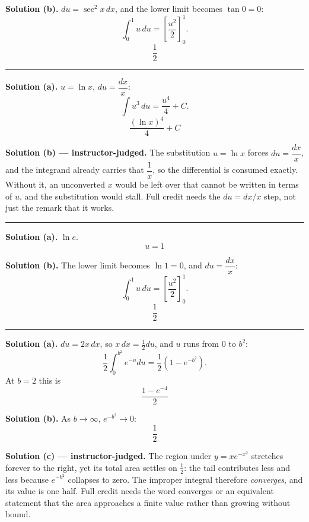 \documentclass[12pt]{article}
\begin{document}
\textbf{Solution (b).} $du = \sec^2 x\,dx$, and the lower limit becomes
$\tan 0 = 0$:
\[ \int_0^{1} u\,du = \left[\frac{u^2}{2}\right]_0^{1}. \]
\[ \boxed{\frac{1}{2}} \]

\vspace{0.15cm}\noindent\rule{\linewidth}{0.2pt}


\textbf{Solution (a).} $u = \ln x$, $du = \dfrac{dx}{x}$:
\[ \int u^3\,du = \frac{u^4}{4} + C. \]
\[ \boxed{\frac{\left(\ln x\right)^4}{4} + C} \]

\textbf{Solution (b) --- instructor-judged.} The substitution $u = \ln x$ forces
$du = \dfrac{dx}{x}$, and the integrand already carries that $\dfrac{1}{x}$, so
the differential is consumed exactly. Without it, an unconverted $x$ would be
left over that cannot be written in terms of $u$, and the substitution would
stall. Full credit needs the $du = dx/x$ step, not just the remark that it works.

\vspace{0.15cm}\noindent\rule{\linewidth}{0.2pt}


\textbf{Solution (a).} $\ln e$.
\[ \boxed{u = 1} \]

\textbf{Solution (b).} The lower limit becomes $\ln 1 = 0$, and
$du = \dfrac{dx}{x}$:
\[ \int_0^{1} u\,du = \left[\frac{u^2}{2}\right]_0^{1}. \]
\[ \boxed{\frac{1}{2}} \]

\vspace{0.15cm}\noindent\rule{\linewidth}{0.2pt}


\textbf{Solution (a).} $du = 2x\,dx$, so $x\,dx = \tfrac{1}{2}du$, and $u$ runs
from $0$ to $b^2$:
\[ \frac{1}{2}\int_0^{b^2}e^{-u}du = \frac{1}{2}\left(1 - e^{-b^2}\right). \]
At $b = 2$ this is
\[ \boxed{\frac{1 - e^{-4}}{2}} \]

\textbf{Solution (b).} As $b \rightarrow \infty$, $e^{-b^2} \rightarrow 0$:
\[ \boxed{\frac{1}{2}} \]

\textbf{Solution (c) --- instructor-judged.} The region under
$y = xe^{-x^2}$ stretches forever to the right, yet its total area settles on
$\tfrac{1}{2}$: the tail contributes less and less because $e^{-b^2}$ collapses
to zero. The improper integral therefore \emph{converges}, and its value is one
half. Full credit needs the word converges or an equivalent statement that the
area approaches a finite value rather than growing without bound.
\end{document}
